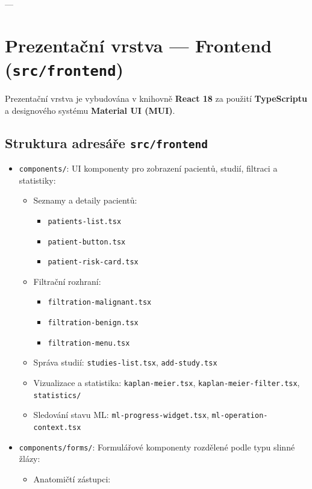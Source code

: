 \documentclass[12pt,a4paper]{article}
\begin{document}
---

\section{Prezentační vrstva --- Frontend (\texttt{src/frontend})}

Prezentační vrstva je vybudována v knihovně \textbf{React 18} za použití \textbf{TypeScriptu} a designového systému \textbf{Material UI (MUI)}.

\subsection{Struktura adresáře \texttt{src/frontend}}
\begin{itemize}
    \item \texttt{components/}: UI komponenty pro zobrazení pacientů, studií, filtraci a statistiky:
    \begin{itemize}
        \item Seznamy a detaily pacientů:
        \begin{itemize}
            \item \texttt{patients-list.tsx}
            \item \texttt{patient-button.tsx}
            \item \texttt{patient-risk-card.tsx}
        \end{itemize}
        \item Filtrační rozhraní:
        \begin{itemize}
            \item \texttt{filtration-malignant.tsx}
            \item \texttt{filtration-benign.tsx}
            \item \texttt{filtration-menu.tsx}
        \end{itemize}
        \item Správa studií: \texttt{studies-list.tsx}, \texttt{add-study.tsx}
        \item Vizualizace a statistika: \texttt{kaplan-meier.tsx}, \texttt{kaplan-meier-filter.tsx}, \texttt{statistics/}
        \item Sledování stavu ML: \texttt{ml-progress-widget.tsx}, \texttt{ml-operation-context.tsx}
    \end{itemize}
    \item \texttt{components/forms/}: Formulářové komponenty rozdělené podle typu slinné žlázy:
    \begin{itemize}
        \item Anatomičtí zástupci:

\end{itemize}
\end{itemize}
\end{document}
